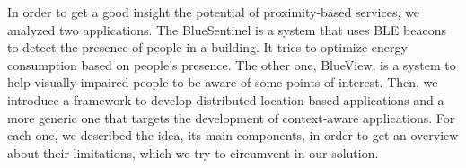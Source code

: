 In order to get a good insight the potential of proximity-based services, we analyzed two applications.
The BlueSentinel is a system that uses \gls{BLE} beacons to detect the presence of people in a building. It tries to optimize energy consumption based on people's presence.
The other one, BlueView, is a system to help visually impaired people to be aware of some points of interest.
Then, we introduce a framework to develop distributed location-based applications and a more generic one that targets the development of context-aware applications.
For each one, we described the idea, its main components, in order to get an overview about their limitations, which we try to circumvent in our solution.
